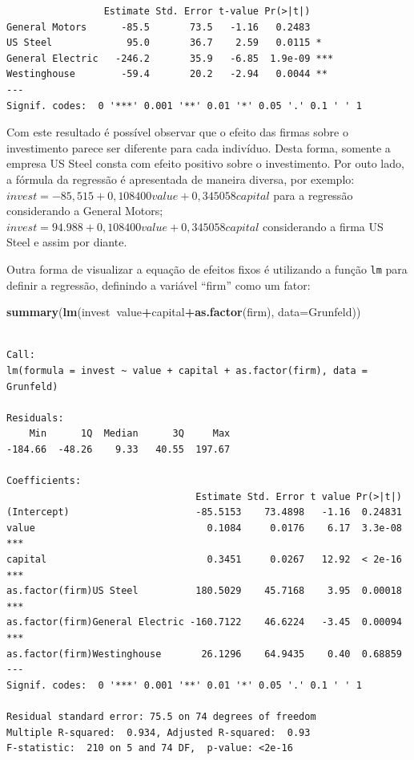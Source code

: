 \documentclass[12pt,brazil,oneside]{book}
\newenvironment{Shaded}{\begin{snugshade}}{\end{snugshade}}
\newcommand{\DataTypeTok}[1]{\textcolor[rgb]{0.13,0.29,0.53}{#1}}
\newcommand{\KeywordTok}[1]{\textcolor[rgb]{0.13,0.29,0.53}{\textbf{#1}}}
\newcommand{\NormalTok}[1]{#1}
\newcommand{\OperatorTok}[1]{\textcolor[rgb]{0.81,0.36,0.00}{\textbf{#1}}}
\begin{document}
\begin{verbatim}
                 Estimate Std. Error t-value Pr(>|t|)    
General Motors      -85.5       73.5   -1.16   0.2483    
US Steel             95.0       36.7    2.59   0.0115 *  
General Electric   -246.2       35.9   -6.85  1.9e-09 ***
Westinghouse        -59.4       20.2   -2.94   0.0044 ** 
---
Signif. codes:  0 '***' 0.001 '**' 0.01 '*' 0.05 '.' 0.1 ' ' 1
\end{verbatim}

Com este resultado é possível observar que o efeito das firmas sobre o investimento parece ser diferente para cada indivíduo. Desta forma, somente a empresa US Steel consta com efeito positivo sobre o investimento. Por outo lado, a fórmula da regressão é apresentada de maneira diversa, por exemplo: \(invest = -85,515 + 0,108400value + 0,345058capital\) para a regressão considerando a General Motors; \(invest = 94.988 + 0,108400value + 0,345058capital\) considerando a firma US Steel e assim por diante.

Outra forma de visualizar a equação de efeitos fixos é utilizando a função \texttt{lm} para definir a regressão, definindo a variável ``firm'' como um fator:

\begin{Shaded}
\begin{Highlighting}[]
\KeywordTok{summary}\NormalTok{(}\KeywordTok{lm}\NormalTok{(invest}\OperatorTok{~}\NormalTok{value}\OperatorTok{+}\NormalTok{capital}\OperatorTok{+}\KeywordTok{as.factor}\NormalTok{(firm), }
           \DataTypeTok{data=}\NormalTok{Grunfeld))}
\end{Highlighting}
\end{Shaded}

\begin{verbatim}

Call:
lm(formula = invest ~ value + capital + as.factor(firm), data = Grunfeld)

Residuals:
    Min      1Q  Median      3Q     Max 
-184.66  -48.26    9.33   40.55  197.67 

Coefficients:
                                 Estimate Std. Error t value Pr(>|t|)    
(Intercept)                      -85.5153    73.4898   -1.16  0.24831    
value                              0.1084     0.0176    6.17  3.3e-08 ***
capital                            0.3451     0.0267   12.92  < 2e-16 ***
as.factor(firm)US Steel          180.5029    45.7168    3.95  0.00018 ***
as.factor(firm)General Electric -160.7122    46.6224   -3.45  0.00094 ***
as.factor(firm)Westinghouse       26.1296    64.9435    0.40  0.68859    
---
Signif. codes:  0 '***' 0.001 '**' 0.01 '*' 0.05 '.' 0.1 ' ' 1

Residual standard error: 75.5 on 74 degrees of freedom
Multiple R-squared:  0.934, Adjusted R-squared:  0.93 
F-statistic:  210 on 5 and 74 DF,  p-value: <2e-16
\end{verbatim}
\end{document}
